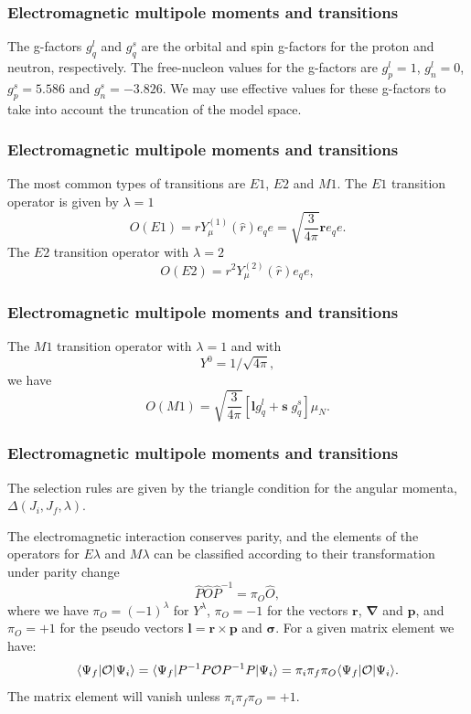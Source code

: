 \documentclass{beamer}
\begin{document}
\begin{frame}
\frametitle{Electromagnetic multipole moments and transitions}

\begin{block}{}
The g-factors $g^{l}_{q}$ and $g^{s}_{q}$
are the orbital and spin g-factors
for the proton and neutron, respectively.
The
free-nucleon values for the g-factors are $g^{l}_{p}=1$, $g^{l}_{n}=0$,
$g^{s}_{p}=5.586$ and $g^{s}_{n}=-3.826$. We may use effective values
for these g-factors to take into account the truncation of the model
space.

\end{block}
\end{frame}

\begin{frame}
\frametitle{Electromagnetic multipole moments and transitions}

\begin{block}{}
The most common types of transitions are $E1$, $E2$ and $M1$.
The $E1$ transition operator is given by $\lambda=1$
\[
O(E1) = rY^{(1)}_{\mu }(\hat{r})e_{q} e= \sqrt{\frac{3}{4\pi }}\mathbf{r}e_{q} e.
\]
The $E2$ transition operator with $\lambda=2$
\[
O(E2) = r^{2}Y^{(2)}_{\mu }(\hat{r})e_{q} e,  
\]
\end{block}
\end{frame}

\begin{frame}
\frametitle{Electromagnetic multipole moments and transitions}

\begin{block}{}
The $M1$ transition operator with $\lambda=1$ and with
\[
  Y^{0}=1/\sqrt{4\pi },
\]
we have
\[
O(M1)=\sqrt{\frac{3}{4\pi }}[\mathbf{l}g^{l }_{q}+\mathbf{s} \; g^{s}_{q}]\mu _{N}. 
\]
\end{block}
\end{frame}

\begin{frame}
\frametitle{Electromagnetic multipole moments and transitions}

\begin{block}{}
The selection rules are given by the triangle condition for the
angular momenta, $\Delta(J_{i},J_{f},\lambda)$. 

The electromagnetic
interaction conserves parity, and the elements of the
operators for $E\lambda$ and $M\lambda$
can be classified according to their transformation under parity
change
\[
\hat{P}\hat{O}\hat{P}^{-1}=\pi_{O}\hat{O}, 
\]
where we have $\pi _{O}=(-1)^{\lambda }$ for $Y^{\lambda }$,
$\pi _{O}=-1$ for the vectors
$\mathbf{r}$, $\mathbf{\nabla}$ and $\mathbf{p}$, and $\pi _{O}=+1$ for the 
pseudo vectors
$\mathbf{l}=\mathbf{r}\times\mathbf{p}$ and $\mathbf{\sigma}$. For a given matrix element we have:
\[
\langle\Psi _{f}\vert {\cal O}\vert \Psi _{i}\rangle =\langle\Psi _{f}\vert P^{-1}P{\cal O}P^{-1}P\vert \Psi _{i}\rangle=\pi _{i}\pi _{f}\pi _{O} \langle\Psi _{f}\vert {\cal O}\vert \Psi _{i}\rangle. 
\]
The matrix element will vanish unless  $\pi _{i}\pi _{f}\pi _{O}=+1$.

\end{block}
\end{frame}
\end{document}
